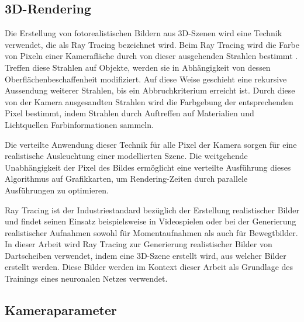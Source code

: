 

\subsection{3D-Rendering}
\label{sec:3d_rendering}

Die Erstellung von fotorealistischen Bildern aus 3D-Szenen wird eine Technik verwendet, die als Ray Tracing bezeichnet wird. Beim Ray Tracing wird die Farbe von Pixeln einer Kamerafläche durch von dieser ausgehenden Strahlen bestimmt \cite{ray_tracing,ray_tracing_distributed,ray_tracing_equations}. Treffen diese Strahlen auf Objekte, werden sie in Abhängigkeit von dessen Oberflächenbeschaffenheit modifiziert. Auf diese Weise geschieht eine rekursive Aussendung weiterer Strahlen, bis ein Abbruchkriterium erreicht ist. Durch diese von der Kamera ausgesandten Strahlen wird die Farbgebung der entsprechenden Pixel bestimmt, indem Strahlen durch Auftreffen auf Materialien und Lichtquellen Farbinformationen sammeln.

Die verteilte Anwendung dieser Technik für alle Pixel der Kamera sorgen für eine realistische Ausleuchtung einer modellierten Szene. Die weitgehende Unabhängigkeit der Pixel des Bildes ermöglicht eine verteilte Ausführung dieses Algorithmus auf Grafikkarten, um Rendering-Zeiten durch parallele Ausführungen zu optimieren.

Ray Tracing ist der Industriestandard bezüglich der Erstellung realistischer Bilder und findet seinen Einsatz beispielsweise in Videospielen oder bei der Generierung realistischer Aufnahmen sowohl für Momentaufnahmen als auch für Bewegtbilder. In dieser Arbeit wird Ray Tracing zur Generierung realistischer Bilder von Dartscheiben verwendet, indem eine 3D-Szene erstellt wird, aus welcher Bilder erstellt werden. Diese Bilder werden im Kontext dieser Arbeit als Grundlage des Trainings eines neuronalen Netzes verwendet.


\subsection{Kameraparameter}
\label{sec:kameras}

